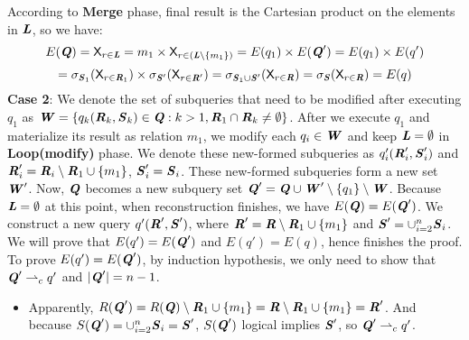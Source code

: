 \begin{Proof}
        \indent  According to \textbf{Merge} phase, final result is the Cartesian product on the elements in $\textbf{\textit{L}}$, so we have:
        $$E(\textbf{\textit{Q}})=\mathsf{X}_{r \in \textbf{\textit{L}}}=m_1 \times \mathsf{X}_{r \in (\textbf{\textit{L}} \setminus \{m_1\})}=E(q_1) \times E(\textbf{\textit{Q}}')=E(q_1) \times E(q')$$
        $$=\sigma_{\textbf{\textit{S}}_1}(\mathsf{X}_{r \in \textbf{\textit{R}}_1}) \times \sigma_{\textbf{\textit{S}}'}(\mathsf{X}_{r \in \textbf{\textit{R}}'})=\sigma_{\textbf{\textit{S}}_1 \cup \textbf{\textit{S}}'}(\mathsf{X}_{r \in \textbf{\textit{R}}})=\sigma_{\textbf{\textit{S}}}(\mathsf{X}_{r \in \textbf{\textit{R}}})=E(q)$$
        \textbf{Case 2}: We denote the set of subqueries that need to be modified after executing $q_1$ as $\textbf{\textit{W}}=\{q_k(\textbf{\textit{R}}_k,\textbf{\textit{S}}_k) \in \textbf{\textit{Q}}:k > 1,\textbf{\textit{R}}_1 \cap \textbf{\textit{R}}_k \neq \emptyset\}$.\newline
        \indent After we execute $q_1$ and materialize its result as relation $m_1$, we modify each $q_i \in \textbf{\textit{W}}$ and keep $\textbf{\textit{L}}=\emptyset$ in \textbf{Loop(modify)} phase. We denote these new-formed subqueries as $q'_i(\textbf{\textit{R}}'_i, \textbf{\textit{S}}'_i)$ and $\textbf{\textit{R}}'_i=\textbf{\textit{R}}_i \setminus \textbf{\textit{R}}_1 \cup \{m_1\}$, $\textbf{\textit{S}}'_i=\textbf{\textit{S}}_i$. These new-formed subqueries form a new set $\textbf{\textit{W}}'$.\newline
        \indent Now, $\textbf{\textit{Q}}$ becomes a new subquery set $\textbf{\textit{Q}}'=\textbf{\textit{Q}} \cup \textbf{\textit{W}}' \setminus \{q_1\} \setminus \textbf{\textit{W}}$. Because $\textbf{\textit{L}} = \emptyset$ at this point, when reconstruction finishes, we have $E(\textbf{\textit{Q}})=E(\textbf{\textit{Q}}')$.\newline
        \indent We construct a new query $q'(\textbf{\textit{R}}',\textbf{\textit{S}}')$, where $\textbf{\textit{R}}'=\textbf{\textit{R}} \setminus \textbf{\textit{R}}_1 \cup \{m_1\}$ and $\textbf{\textit{S}}'=\cup_{i=2}^{n} \textbf{\textit{S}}_i$. We will prove that $E(q')=E(\textbf{\textit{Q}}')$ and $E(q')=E(q)$, hence finishes the proof. To prove $E(q')=E(\textbf{\textit{Q}}')$, by induction hypothesis, we only need to show that $\textbf{\textit{Q}}' \rightharpoonup_c q'$ and $|\textbf{\textit{Q}}'|=n-1$.
        \begin{itemize}[leftmargin = 15pt]
            \item Apparently, $R(\textbf{\textit{Q}}')=R(\textbf{\textit{Q}}) \setminus \textbf{\textit{R}}_1 \cup \{m_1\}=\textbf{\textit{R}} \setminus \textbf{\textit{R}}_1 \cup \{m_1\}=\textbf{\textit{R}}'$. And because $S(\textbf{\textit{Q}}')=\cup_{i=2}^{n} \textbf{\textit{S}}_i=\textbf{\textit{S}}'$, $S(\textbf{\textit{Q}}')$ logical implies $\textbf{\textit{S}}'$, so $\textbf{\textit{Q}}' \rightharpoonup_c q'$.

\end{itemize}
\end{Proof}
